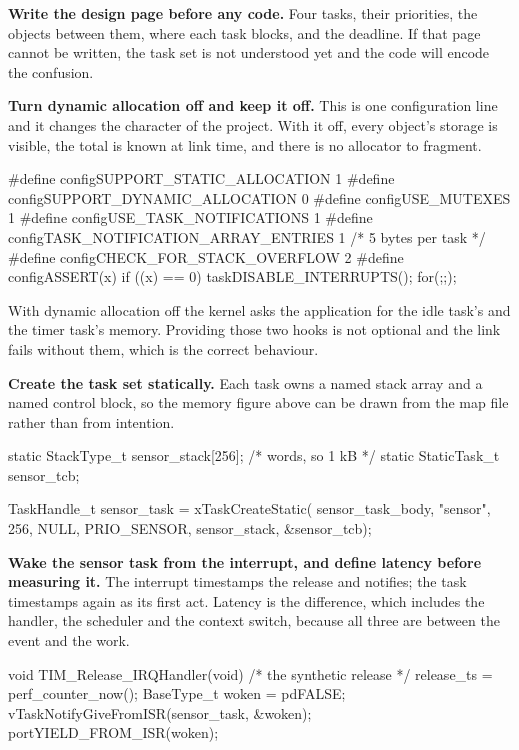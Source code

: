 \begin{steps}
\item \textbf{Write the design page before any code.} Four tasks, their
priorities, the objects between them, where each task blocks, and the deadline.
If that page cannot be written, the task set is not understood yet and the code
will encode the confusion.

\item \textbf{Turn dynamic allocation off and keep it off.} This is one
configuration line and it changes the character of the project. With it off,
every object's storage is visible, the total is known at link time, and there is
no allocator to fragment.
\begin{ccode}
#define configSUPPORT_STATIC_ALLOCATION     1
#define configSUPPORT_DYNAMIC_ALLOCATION    0
#define configUSE_MUTEXES                   1
#define configUSE_TASK_NOTIFICATIONS        1
#define configTASK_NOTIFICATION_ARRAY_ENTRIES 1   /* 5 bytes per task */
#define configCHECK_FOR_STACK_OVERFLOW      2
#define configASSERT(x) if ((x) == 0) { taskDISABLE_INTERRUPTS(); for(;;); }
\end{ccode}
With dynamic allocation off the kernel asks the application for the idle task's
and the timer task's memory. Providing those two hooks is not optional and the
link fails without them, which is the correct behaviour.

\item \textbf{Create the task set statically.} Each task owns a named stack
array and a named control block, so the memory figure above can be drawn from
the map file rather than from intention.
\begin{ccode}
static StackType_t  sensor_stack[256];          /* words, so 1 kB */
static StaticTask_t sensor_tcb;

TaskHandle_t sensor_task = xTaskCreateStatic(
    sensor_task_body, "sensor", 256, NULL,
    PRIO_SENSOR, sensor_stack, &sensor_tcb);
\end{ccode}

\item \textbf{Wake the sensor task from the interrupt, and define latency
before measuring it.} The interrupt timestamps the release and notifies; the
task timestamps again as its first act. Latency is the difference, which
includes the handler, the scheduler and the context switch, because all three
are between the event and the work.
\begin{ccode}
void TIM_Release_IRQHandler(void)             /* the synthetic release */
{
    release_ts = perf_counter_now();
    BaseType_t woken = pdFALSE;
    vTaskNotifyGiveFromISR(sensor_task, &woken);
    portYIELD_FROM_ISR(woken);
}


\end{ccode}
\end{steps}

